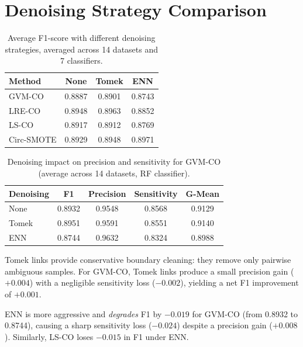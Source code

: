 \section{Denoising Strategy Comparison}
\label{sec:abl:denoising}

\begin{table}[H]
\centering
\caption{Average F1-score with different denoising strategies, averaged across 14 datasets and 7 classifiers.}
\label{tab:abl:denoising}
\begin{tabular}{lccc}
\toprule
\textbf{Method} & \textbf{None} & \textbf{Tomek} & \textbf{ENN} \\
\midrule
GVM-CO     & 0.8887 & 0.8901 & 0.8743 \\
LRE-CO     & 0.8948 & 0.8963 & 0.8852 \\
LS-CO      & 0.8917 & 0.8912 & 0.8769 \\
Circ-SMOTE & 0.8929 & 0.8948 & 0.8971 \\
\bottomrule
\end{tabular}
\end{table}

\begin{table}[H]
\centering
\caption{Denoising impact on precision and sensitivity for GVM-CO (average across 14 datasets, RF classifier).}
\label{tab:abl:denoise_detail}
\begin{tabular}{lcccc}
\toprule
\textbf{Denoising} & \textbf{F1} & \textbf{Precision} & \textbf{Sensitivity} & \textbf{G-Mean} \\
\midrule
None  & 0.8932 & 0.9548 & 0.8568 & 0.9129 \\
Tomek & 0.8951 & 0.9591 & 0.8551 & 0.9140 \\
ENN   & 0.8744 & 0.9632 & 0.8324 & 0.8988 \\
\bottomrule
\end{tabular}
\end{table}

Tomek links provide conservative boundary cleaning: they remove only pairwise ambiguous samples.
For GVM-CO, Tomek links produce a small precision gain ($+0.004$) with a negligible sensitivity loss ($-0.002$), yielding a net F1 improvement of $+0.001$.

ENN is more aggressive and \emph{degrades} F1 by $-0.019$ for GVM-CO (from 0.8932 to 0.8744), causing a sharp sensitivity loss ($-0.024$) despite a precision gain ($+0.008$).
Similarly, LS-CO loses $-0.015$ in F1 under ENN.

